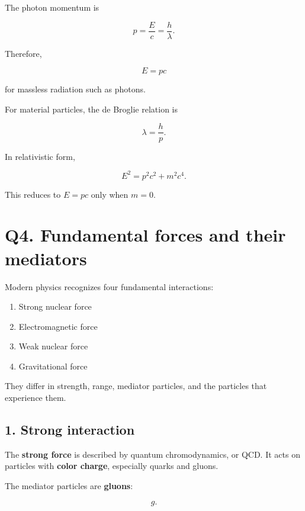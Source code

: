 \documentclass[12pt]{article}
\begin{document}
The photon momentum is

\begin{equation}
p=\frac{E}{c}=\frac{h}{\lambda}.
\end{equation}

Therefore,

\begin{equation}
E=pc
\end{equation}

for massless radiation such as photons.

For material particles, the de Broglie relation is

\begin{equation}
\lambda=\frac{h}{p}.
\end{equation}

In relativistic form,

\begin{equation}
E^2=p^2c^2+m^2c^4.
\end{equation}

This reduces to $E=pc$ only when $m=0$.

\section*{Q4. Fundamental forces and their mediators}

Modern physics recognizes four fundamental interactions:

\begin{enumerate}
    \item Strong nuclear force
    \item Electromagnetic force
    \item Weak nuclear force
    \item Gravitational force
\end{enumerate}

They differ in strength, range, mediator particles, and the particles that experience them.

\subsection*{1. Strong interaction}

The \textbf{strong force} is described by quantum chromodynamics, or QCD. It acts on particles with \textbf{color charge}, especially quarks and gluons.

The mediator particles are \textbf{gluons}:

\[
g.
\]
\end{document}
